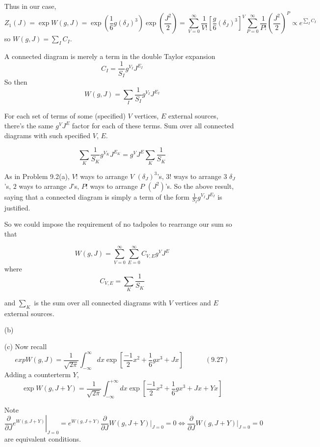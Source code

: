 \documentclass[twoside]{amsart}
\begin{document}
\begin{itemize}
Thus in our case, 
\[
Z_1(J) = \exp{ W(g,J)} = \exp{ \left( \frac{1}{6} g (\delta_J)^3 \right)} \exp{ \left( \frac{J^2}{2} \right) } = \sum_{V=0}^{\infty} \frac{1}{V!} \left[ \frac{ g}{6} (\delta_J)^3 \right]^V \sum_{P=0}^{\infty} \frac{1}{P!} \left( \frac{J^2}{2} \right)^P \propto e^{\sum_I C_I }
\]
so $W(g,J) = \sum_I C_I$.  

A connected diagram is merely a term in the double Taylor expansion
\[
C_I = \frac{1}{S_I} g^{V_I} J^{E_I}
\]
So then
\[
W(g,J) = \sum_I \frac{1}{S_I} g^{V_I} J^{E_I}
\]

For each set of terms of some (specified) $V$ vertices, $E$ external sources, there's the same $g^V J^E$ factor for each of these terms.  Sum over all connected diagrams with such specified $V$, $E$.  

\[
\sum_K \frac{1}{S_K} g^{V_K} J^{E_K} = g^V J^E \sum_K \frac{1}{S_K}
\]



As in Problem 9.2(a), $V!$ ways to arrange $V$ $(\delta_J)^3$'s, $3!$ ways to arrange $3$ $\delta_J$'s, $2$ ways to arrange $J$'s, $P!$ ways to arrange $P$ $(J^2)$'s.  So the above result, saying that a connected diagram is simply a term of the form $\frac{1}{S_I} g^{V_I} J^{E_I}$ is justified.    

So we could impose the requirement of no tadpoles to rearrange our sum so that 
 
\[
W(g,J) = \sum_{V=0}^{\infty} \sum_{E=0}^{\infty} C_{V,E} g^V J^E
\]
where 
\[
\boxed{ C_{V,E} = \sum_K \frac{1}{S_K} }
\]

and $\sum_K$ is the sum over all connected diagrams with $V$ vertices and $E$ external sources.
\item[(b)]
\item[(c)] Now recall 
\[
exp{ W(g,J)} = \frac{1}{ \sqrt{ 2 \pi } } \int_{-\infty}^{\infty} dx \exp{ \left[ \frac{-1}{2} x^2 + \frac{1}{6} gx^3 +Jx \right] } \quad \quad \quad \, (9.27) 
\]
Adding a counterterm $Y$, 
\[
\exp{ W(g, J + Y) } = \frac{1}{ \sqrt{2 \pi }} \int_{-\infty}^{+\infty} dx \exp{ \left[ \frac{-1}{2} x^2 + \frac{1}{6} gx^3+ Jx + Y x \right] }
\]

Note
\[
\left. \frac{ \partial}{ \partial J} e^{W(g,J+Y) } \right|_{J=0} = e^{ W(g, J+Y) } \frac{ \partial }{ \partial J} \left. W(g,J+Y) \right|_{J=0} = 0 \Longleftrightarrow \frac{ \partial}{ \partial J} \left. W(g,J+Y) \right|_{J=0} = 0 
\]
are equivalent conditions.


\end{itemize}
\end{document}
